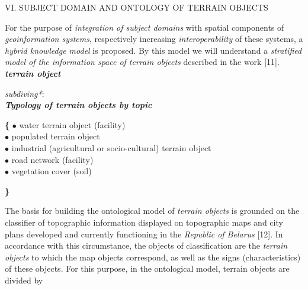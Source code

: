 \documentclass{article}
\begin{document}
\begin{multicols}{2}
    \begin{center}
        VI. SUBJECT DOMAIN AND ONTOLOGY OF TERRAIN OBJECTS
    \end{center}
    
    For the purpose of \textit{integration of subject domains} with spatial components of \textit{geoinformation systems}, respectively increasing \textit{interoperability} of these systems, a \textit{hybrid knowledge model} is proposed. By this model we will understand a \textit{stratified model of the information space of terrain objects} described in the work [11]. \\

    \noindent \textit{\textbf{terrain object}}
    \vspace{-0.3cm}
    \begin{description}[labelwidth=0.5cm, itemsep=-1mm]
        \item[$\Rightarrow$] \textit{subdiving*}: \vspace{0mm} \\
        \textbf{\textit{Typology of terrain objects by topic}}
        \vspace{-0.3cm}\\
        \item[$=$]
        \begin{description}
            \begin{itemize}
                \textbf{\{} \hspace{-2.3mm} $\bullet$ \hspace{4.7mm} water terrain object (facility) \\
                            $\bullet$ \hspace{0.5cm} populated terrain object \\
                            $\bullet$ \hspace{1.5mm} industrial (agricultural or socio-cultural) terrain object \\
                            $\bullet$ \hspace{0.5cm} road network (facility) \\
                            $\bullet$ \hspace{0.5cm} vegetation cover (soil) \par
                \hspace{-3mm} \textbf{\}} \\
            \end{itemize}
        \end{description}
    \end{description}
        \vspace{-4mm} \par
    The basis for building the ontological model of \textit{terrain objects} is grounded on the classifier of topographic information displayed on topographic maps and city plans developed and currently functioning in the \textit{Republic of Belarus} [12]. In accordance with this circumstance, the objects of classification are the \textit{terrain objects} to which the map objects correspond, as well as the signs (characteristics) of these objects. For this purpose, in the ontological model, terrain objects are divided by

\end{multicols}
\end{document}
